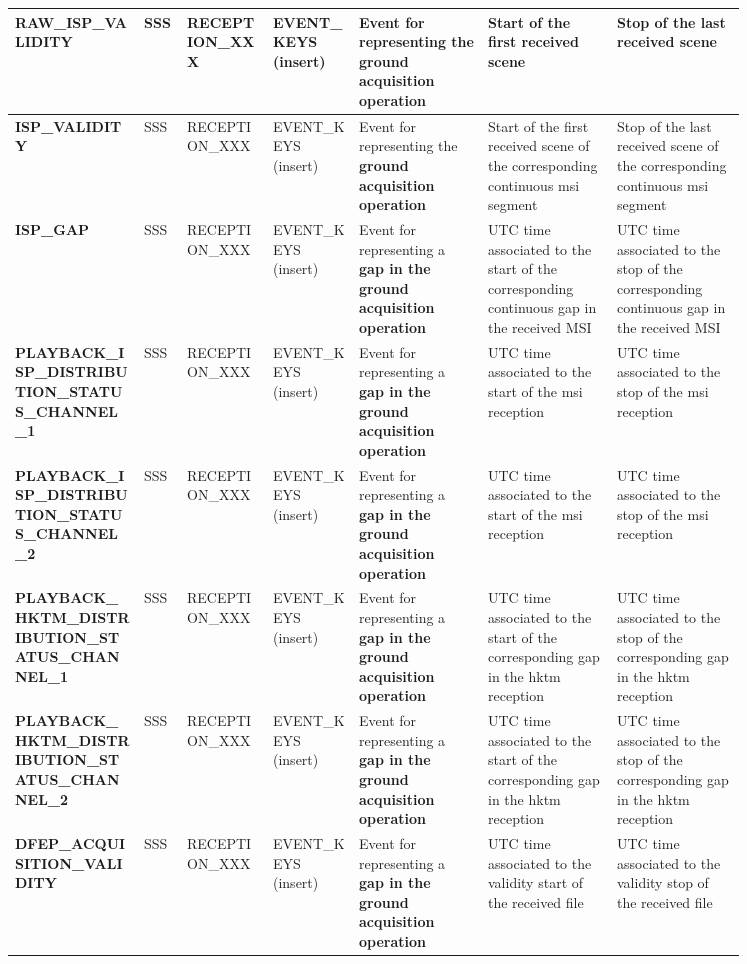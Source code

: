 \begin{landscape}
\begin{longtable}{|M{0.15\linewidth}|M{0.05\linewidth}|M{0.10\linewidth}|M{0.10\linewidth}|M{0.15\linewidth}|M{0.15\linewidth}|M{0.15\linewidth}|}
\textbf{RAW\_ISP\_VALIDITY} & SSS & \- RECEPTION\_XXX & EVENT\_KEYS (insert) & Event for representing the \textbf{ground acquisition operation} & Start of the first received scene & Stop of the last received scene \\ \hline
\textbf{ISP\_VALIDITY} & SSS & \- RECEPTION\_XXX & EVENT\_KEYS (insert) & Event for representing the \textbf{ground acquisition operation} & Start of the first received scene of the corresponding continuous \acrshort{msi} segment & Stop of the last received scene of the corresponding continuous \acrshort{msi} segment \\ \hline
\textbf{ISP\_GAP} & SSS & \- RECEPTION\_XXX & EVENT\_KEYS (insert) & Event for representing a \textbf{gap in the ground acquisition operation} & UTC time associated to the start of the corresponding continuous gap in the received MSI & UTC time associated to the stop of the corresponding continuous gap in the received MSI \\ \hline
\textbf{PLAYBACK\_ISP\_DISTRIBUTION\_STATUS\_CHANNEL\_1} & SSS & \- RECEPTION\_XXX & EVENT\_KEYS (insert) & Event for representing a \textbf{gap in the ground acquisition operation} & UTC time associated to the start of the \acrshort{msi} reception & UTC time associated to the stop of the \acrshort{msi} reception \\ \hline
\textbf{PLAYBACK\_ISP\_DISTRIBUTION\_STATUS\_CHANNEL\_2} & SSS & \- RECEPTION\_XXX & EVENT\_KEYS (insert) & Event for representing a \textbf{gap in the ground acquisition operation} & UTC time associated to the start of the \acrshort{msi} reception & UTC time associated to the stop of the \acrshort{msi} reception \\ \hline
\textbf{PLAYBACK\_HKTM\_DISTRIBUTION\_STATUS\_CHANNEL\_1} & SSS & \- RECEPTION\_XXX & EVENT\_KEYS (insert) & Event for representing a \textbf{gap in the ground acquisition operation} & UTC time associated to the start of the corresponding gap in the \acrshort{hktm} reception & UTC time associated to the stop of the corresponding gap in the \acrshort{hktm} reception \\ \hline
\textbf{PLAYBACK\_HKTM\_DISTRIBUTION\_STATUS\_CHANNEL\_2} & SSS & \- RECEPTION\_XXX & EVENT\_KEYS (insert) & Event for representing a \textbf{gap in the ground acquisition operation} & UTC time associated to the start of the corresponding gap in the \acrshort{hktm} reception & UTC time associated to the stop of the corresponding gap in the \acrshort{hktm} reception \\ \hline
\textbf{DFEP\_ACQUISITION\_VALIDITY} & SSS & \- RECEPTION\_XXX & EVENT\_KEYS (insert) & Event for representing a \textbf{gap in the ground acquisition operation} & UTC time associated to the validity start of the received file & UTC time associated to the validity stop of the received file \\ \hline

\end{longtable}
\end{landscape}
